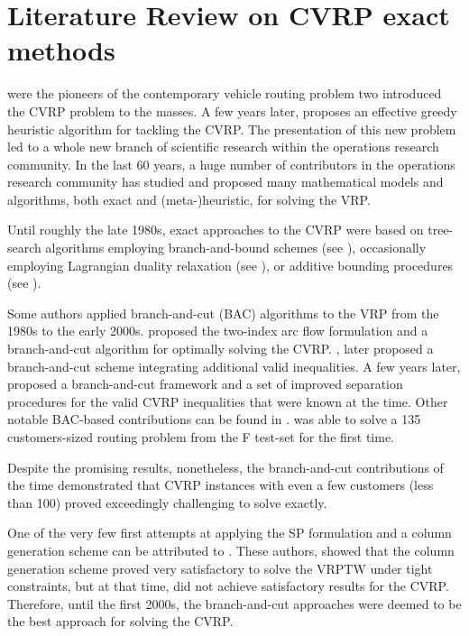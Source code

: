 \chapter{Literature Review on CVRP exact methods}
\label{sec:intro-literature-review}

\textcite{dantzig1959} were
the pioneers of the contemporary vehicle routing problem two
introduced the CVRP problem to the masses.
A few years later, \textcite{clarke1964} proposes
an effective greedy heuristic algorithm for tackling the CVRP.
The presentation of this new problem led to a whole new branch
of scientific research within the operations research community.
In the last 60 years, a huge number of contributors in
the operations research community has studied and proposed many
mathematical models and algorithms, both exact and (meta-)heuristic,
for solving the VRP.

Until roughly the late 1980s, exact approaches to the CVRP were
based on tree-search algorithms employing branch-and-bound schemes
(see \cite{pierce1969, christofides1969, christofides1981exact, laporte1986}),
occasionally employing Lagrangian duality relaxation (see \cite{fisher1994, miller1995}),
or additive bounding procedures (see \cite{fischetti1994a, hadjiconstantinou1995}).

Some authors applied branch-and-cut (BAC) algorithms  to the VRP from the 1980s to the early 2000s.
\textcite{laporte1983, laporte1985} proposed the two-index arc flow formulation
and a branch-and-cut algorithm for optimally solving the CVRP.
\Textcite{augerat1995approche}, later proposed a branch-and-cut scheme
integrating additional valid inequalities.
A few years later, \textcite{lysgaard2004}
proposed a branch-and-cut framework and
a set of improved separation procedures for the valid CVRP inequalities that were known at the time.
Other notable BAC-based contributions
can be found in \textcite{araqueg1994, augerat1995, achuthan1996, blasum2000, ralphs2003, achuthan2003, baldacci2004}.
\citeauthor{baldacci2004} was able to solve a 135 customers-sized routing problem
from the F test-set  \textcite{fisher1994}
for the first time.

Despite the promising results, nonetheless,
the branch-and-cut contributions of the time demonstrated
that CVRP instances with even a few customers (less than 100)
proved exceedingly challenging to solve exactly.

One of the very few first attempts at applying
the SP formulation and a column generation scheme can
be attributed to \textcite{desrosiers1984, agarwal1989setpartitioningbased}.
These authors, showed that the column generation scheme proved
very satisfactory to solve the VRPTW under tight constraints,
but at that time, did not achieve satisfactory results for the CVRP.
Therefore, until the first 2000s, the branch-and-cut approaches
were deemed to be the best approach for solving the CVRP.


